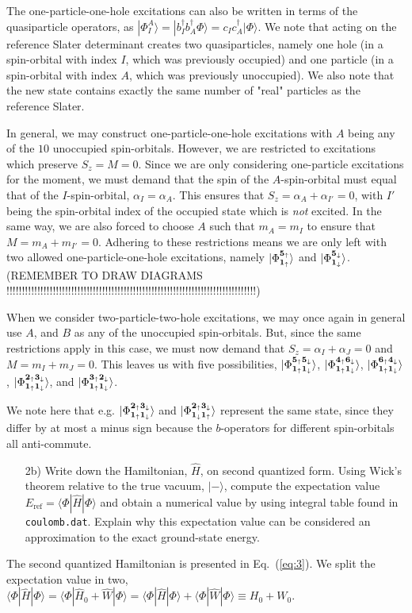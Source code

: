 \documentclass[a4paper]{article}
\newcommand{\eq} [1]{Eq.\ (\ref{eq:#1})}
\renewcommand{\u}[1]{{\bf #1}_\uparrow}
\renewcommand{\d}[1]{{\bf #1}_\downarrow}
\begin{document}
The one-particle-one-hole excitations can also be written in terms of the quasiparticle operators, as $|\Phi^A_I\rangle=|b_I^\dagger b_A^\dagger\Phi\rangle = c_I c_A^\dagger |\Phi\rangle$. We note that acting on the reference Slater determinant creates two quasiparticles, namely one hole (in a spin-orbital with index $I$, which was previously occupied) and one particle (in a spin-orbital with index $A$, which was previously unoccupied). We also note that the new state contains exactly the same number of "real" particles as the reference Slater.

In general, we may construct one-particle-one-hole excitations with $A$ being any of the $10$ unoccupied spin-orbitals. However, we are restricted to excitations which preserve $S_z=M=0$. Since we are only considering one-particle excitations for the moment, we must demand that the spin of the $A$-spin-orbital must equal that of the $I$-spin-orbital, $\alpha_I=\alpha_A$. This ensures that $S_z=\alpha_A+\alpha_{I'}=0$, with $I'$ being the spin-orbital index of the occupied state which is \emph{not} excited. In the same way, we are also forced to choose $A$ such that $m_A=m_I$ to ensure that $M=m_A+m_{I'}=0$. Adhering to these restrictions means we are only left with two allowed one-particle-one-hole excitations, namely $|\Phi^{\u{5}}_{\u{1}}\rangle$ and $|\Phi^{\d{5}}_{\d{1}}\rangle$. (REMEMBER TO DRAW DIAGRAMS !!!!!!!!!!!!!!!!!!!!!!!!!!!!!!!!!!!!!!!!!!!!!!!!!!!!!!!!!!!!!!!!!!!!!!!!!!!!!!!!!)

When we consider two-particle-two-hole excitations, we may once again in general use $A$, and $B$ as any of the unoccupied spin-orbitals. But, since the same restrictions apply in this case, we must now demand that $S_z=\alpha_I + \alpha_J=0$ and $M=m_I+m_J=0$. This leaves us with five possibilities,
$|\Phi^{\u{5}\d{5}}_{\u{1}\d{1}}\rangle$, $|\Phi^{\u{4}\d{6}}_{\u{1}\d{1}}\rangle$, $|\Phi^{\u{6}\d{4}}_{\u{1}\d{1}}\rangle$, $|\Phi^{\u{2}\d{3}}_{\u{1}\d{1}}\rangle$, and $|\Phi^{\u{3}\d{2}}_{\u{1}\d{1}}\rangle$. 

We note here that e.g. $|\Phi^{\u{2}\d{3}}_{\u{1}\d{1}}\rangle$ and $|\Phi^{\u{2}\d{3}}_{\d{1}\u{1}}\rangle$ represent the same state, since they differ by at most a minus sign because the $b$-operators for different spin-orbitals all anti-commute.

\newpage
\begin{exframe}
\begin{itemize}
  \item[2b)] Write down the Hamiltonian, $\hat{H}$, on second quantized form. Using Wick's theorem relative to the true vacuum, $|-\rangle$, compute the expectation value $E_\text{ref}=\langle \Phi |\hat{H} | \Phi\rangle$ and obtain a numerical value by using integral table found in \texttt{coulomb.dat}. Explain why this expectation value can be considered an approximation to the exact ground-state energy. 
\end{itemize}
\end{exframe}
The second quantized Hamiltonian is presented in \eq{3}. We split the expectation value in two, $\langle \Phi |\hat{H} | \Phi\rangle=\langle \Phi |\hat{H}_0 +\hat{W} | \Phi\rangle = \langle \Phi |\hat{H} | \Phi\rangle + \langle \Phi |\hat{W} | \Phi\rangle \equiv H_0+W_0$. 
\end{document}
